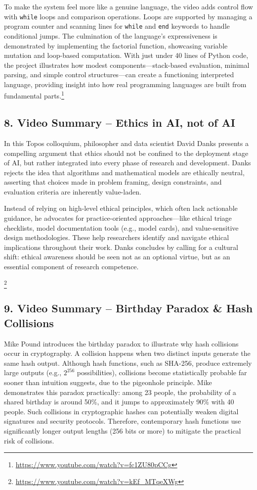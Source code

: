 \documentclass{article}
\theoremstyle{theorem}
\theoremstyle{definition}
\theoremstyle{remark}
\begin{document}
To make the system feel more like a genuine language, the video adds control flow with \texttt{while} loops and comparison operations. Loops are supported by managing a program counter and scanning lines for \texttt{while} and \texttt{end} keywords to handle conditional jumps. The culmination of the language’s expressiveness is demonstrated by implementing the factorial function, showcasing variable mutation and loop-based computation. With just under 40 lines of Python code, the project illustrates how modest components—stack-based evaluation, minimal parsing, and simple control structures—can create a functioning interpreted language, providing insight into how real programming languages are built from fundamental parts.\footnote{\url{https://www.youtube.com/watch?v=fc1ZU80pCCg}}

\subsection*{8. Video Summary – Ethics in AI, not of AI}

In this Topos colloquium, philosopher and data scientist David Danks presents a compelling argument that ethics should not be confined to the deployment stage of AI, but rather integrated into every phase of research and development. Danks rejects the idea that algorithms and mathematical models are ethically neutral, asserting that choices made in problem framing, design constraints, and evaluation criteria are inherently value-laden.

Instead of relying on high-level ethical principles, which often lack actionable guidance, he advocates for practice-oriented approaches—like ethical triage checklists, model documentation tools (e.g., model cards), and value-sensitive design methodologies. These help researchers identify and navigate ethical implications throughout their work. Danks concludes by calling for a cultural shift: ethical awareness should be seen not as an optional virtue, but as an essential component of research competence.

\footnote{\url{https://www.youtube.com/watch?v=kEf_MTqeXWg}}

\subsection*{9. Video Summary – Birthday Paradox \& Hash Collisions}

Mike Pound introduces the birthday paradox to illustrate why hash collisions occur in cryptography. A collision happens when two distinct inputs generate the same hash output. Although hash functions, such as SHA-256, produce extremely large outputs (e.g., \(2^{256}\) possibilities), collisions become statistically probable far sooner than intuition suggests, due to the pigeonhole principle. Mike demonstrates this paradox practically: among 23 people, the probability of a shared birthday is around 50\%, and it jumps to approximately 90\% with 40 people. Such collisions in cryptographic hashes can potentially weaken digital signatures and security protocols. Therefore, contemporary hash functions use significantly longer output lengths (256 bits or more) to mitigate the practical risk of collisions.
\end{document}
